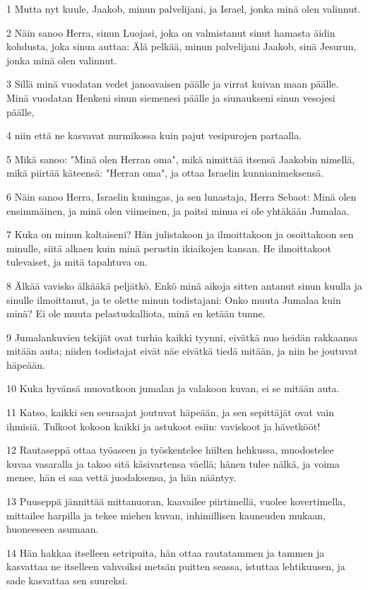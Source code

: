 \par 1 Mutta nyt kuule, Jaakob, minun palvelijani, ja Israel, jonka minä olen valinnut.
\par 2 Näin sanoo Herra, sinun Luojasi, joka on valmistanut sinut hamasta äidin kohdusta, joka sinua auttaa: Älä pelkää, minun palvelijani Jaakob, sinä Jesurun, jonka minä olen valinnut.
\par 3 Sillä minä vuodatan vedet janoavaisen päälle ja virrat kuivan maan päälle. Minä vuodatan Henkeni sinun siemenesi päälle ja siunaukseni sinun vesojesi päälle,
\par 4 niin että ne kasvavat nurmikossa kuin pajut vesipurojen partaalla.
\par 5 Mikä sanoo: "Minä olen Herran oma", mikä nimittää itsensä Jaakobin nimellä, mikä piirtää käteensä: "Herran oma", ja ottaa Israelin kunnianimeksensä.
\par 6 Näin sanoo Herra, Israelin kuningas, ja sen lunastaja, Herra Sebaot: Minä olen ensimmäinen, ja minä olen viimeinen, ja paitsi minua ei ole yhtäkään Jumalaa.
\par 7 Kuka on minun kaltaiseni? Hän julistakoon ja ilmoittakoon ja osoittakoon sen minulle, siitä alkaen kuin minä perustin ikiaikojen kansan. He ilmoittakoot tulevaiset, ja mitä tapahtuva on.
\par 8 Älkää vavisko älkääkä peljätkö. Enkö minä aikoja sitten antanut sinun kuulla ja sinulle ilmoittanut, ja te olette minun todistajani: Onko muuta Jumalaa kuin minä? Ei ole muuta pelastuskalliota, minä en ketään tunne.
\par 9 Jumalankuvien tekijät ovat turhia kaikki tyynni, eivätkä nuo heidän rakkaansa mitään auta; niiden todistajat eivät näe eivätkä tiedä mitään, ja niin he joutuvat häpeään.
\par 10 Kuka hyvänsä muovatkoon jumalan ja valakoon kuvan, ei se mitään auta.
\par 11 Katso, kaikki sen seuraajat joutuvat häpeään, ja sen sepittäjät ovat vain ihmisiä. Tulkoot kokoon kaikki ja astukoot esiin: vaviskoot ja hävetkööt!
\par 12 Rautaseppä ottaa työaseen ja työskentelee hiilten hehkussa, muodostelee kuvaa vasaralla ja takoo sitä käsivartensa väellä; hänen tulee nälkä, ja voima menee, hän ei saa vettä juodaksensa, ja hän nääntyy.
\par 13 Puuseppä jännittää mittanuoran, kaavailee piirtimellä, vuolee kovertimella, mittailee harpilla ja tekee miehen kuvan, inhimillisen kauneuden mukaan, huoneeseen asumaan.
\par 14 Hän hakkaa itselleen setripuita, hän ottaa rautatammen ja tammen ja kasvattaa ne itselleen vahvoiksi metsän puitten seassa, istuttaa lehtikuusen, ja sade kasvattaa sen suureksi.
